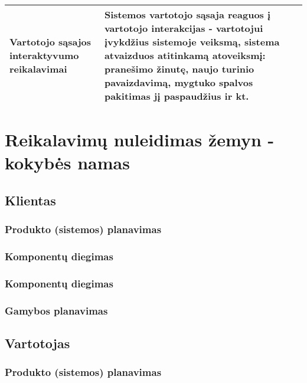 \documentclass{VUMIFPSkursinis}
\begin{document}
\begin{center}
\begin{longtable}{|C{2cm}|L{5cm}|L{8cm}|}
		\color{blue}Vartotojo sąsajos interaktyvumo reikalavimai          &
		\color{blue}Sistemos vartotojo sąsaja reaguos į vartotojo interakcijas - vartotojui įvykdžius sistemoje veiksmą, sistema atvaizduos atitinkamą atoveiksmį: pranešimo žinutę, naujo turinio pavaizdavimą, mygtuko spalvos pakitimas jį paspaudžius ir kt.                                                                                                                                                                                                                                                                                                                                                                                                                                                                                                                                              \\ \hline
	\end{longtable}
\end{center}

\section{Reikalavimų nuleidimas žemyn - kokybės namas}
\subsection{Klientas}
\subsubsection{Produkto (sistemos) planavimas}
\subsubsection{Komponentų diegimas}
\subsubsection{Komponentų diegimas}
\subsubsection{Gamybos planavimas}
\subsection{Vartotojas}
\subsubsection{Produkto (sistemos) planavimas}
\end{document}
